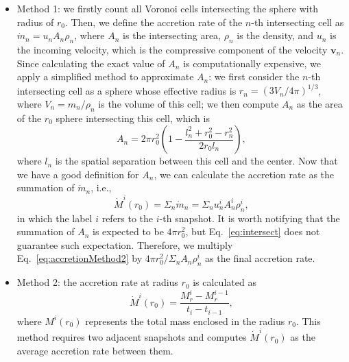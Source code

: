 \documentclass[fleqn,usenatbib]{mnras}
\begin{document}
\begin{itemize}
    \item Method 1: we firstly count all Voronoi cells intersecting the sphere with radius of $r_0$. Then, we define the accretion rate of the $n$-th intersecting cell as $\dot{m}_n=u_n A_n\rho_n$, where $A_n$ is the intersecting area, $\rho_n$ is the density, and $u_n$ is the incoming velocity, which is the compressive component of the velocity $\mathbf{v}_n$. Since calculating the exact value of $A_n$ is computationally expensive, we apply a simplified method to approximate $A_n$: we first consider the $n$-th intersecting cell as a sphere whose effective radius is $r_n=(3V_n/4\pi)^{1/3}$, where $V_n=m_n/\rho_n$ is the volume of this cell; we then compute $A_n$ as the area of the $r_0$ sphere intersecting this cell, which is
    \begin{equation}
    	A_n=2\pi r_0^2\left(1-\frac{l_n^2+r_0^2-r_n^2}{2r_0l_n}\right),
    	\label{eq:intersect}
    \end{equation}
    where $l_n$ is the spatial separation between this cell and the center. Now that we have a good definition for $A_n$, we can calculate the accretion rate as the summation of $\dot{m}_n$, i.e.,
    \begin{equation}
        \dot{M}^i(r_0)=\Sigma_n\dot{m}_n=\Sigma_n u^i_n A^i_n \rho^i_n,
        \label{eq:accretionMethod2}
    \end{equation}
    in which the label $i$ refers to the $i$-th snapshot. It is worth notifying that the summation of $A_n$ is expected to be $4\pi r_0^2$, but Eq.~\ref{eq:intersect} does not guarantee such expectation. Therefore, we multiply Eq.~\ref{eq:accretionMethod2} by $4\pi r_0^2/\Sigma_n A_n \rho^i_n$ as the final accretion rate.
    \item Method 2: the accretion rate at radius $r_0$ is calculated as
    \begin{equation}
        \dot{M}^i(r_0)=\frac{M^i_r-M^{i-1}_r}{t_i-t_{i-1}},
        \label{eq:accretionMethod1}
    \end{equation}
    where $M^i(r_0)$ represents the total mass enclosed in the radius $r_0$. This method requires two adjacent snapshots and computes $\dot{M}^i(r_0)$ as the average accretion rate between them.
\end{itemize}
\end{document}
